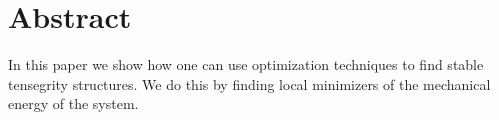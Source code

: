 \section{Abstract}


In this paper we show how one can use optimization techniques to find stable tensegrity structures. We do this by finding local minimizers of the mechanical energy of the system. 